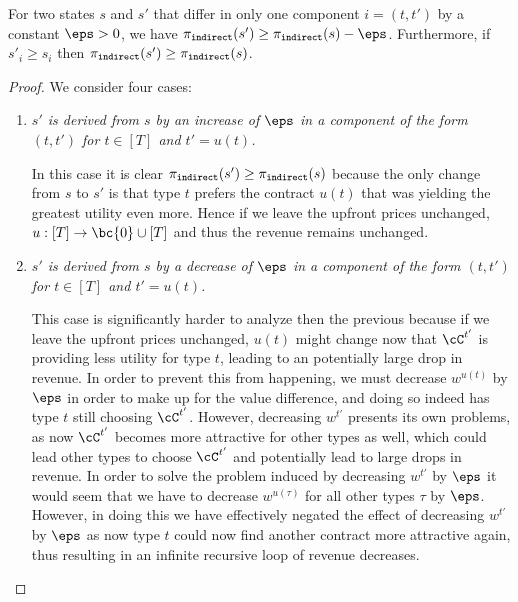 
    \begin{claim*} \label{differ}
         For two states $s$ and $s'$ that differ in only one component $i = (t, t')$ by a constant $\eps>0$, we have $\pi_{\tt{indirect}}(s') \ge \pi_{\tt{indirect}}(s) - \eps$. Furthermore, if $s'_i \ge s_i$ then $\pi_{\tt{indirect}}(s') \ge \pi_{\tt{indirect}}(s)$.
    \end{claim*}
    \begin{proof}
        We consider four cases:

    \begin{enumerate}
        
        \item[\tbf{Case 1:}] \emph{$s'$ is derived from $s$ by an increase of $\eps$ in a component of the form $(t,t')$ for $t\in [T]$ and $t' = u(t)$.}

        In this case it is clear $\pi_{\tt{indirect}}(s') \ge \pi_{\tt{indirect}}(s)$ because the only change from $s$ to $s'$ is that type $t$ prefers the contract $u(t)$ that was yielding the greatest utility even more. Hence if we leave the upfront prices unchanged, $u:[T]\to  \bc{0} \cup [T]$ and thus the revenue remains unchanged.

        \item[\tbf{Case 2:}] \emph{$s'$ is derived from $s$ by a decrease of $\eps$ in a component of the form $(t,t')$ for $t\in [T]$ and $t' = u(t)$.}

        This case is significantly harder to analyze then the previous because if we leave the upfront prices unchanged, $u(t)$ might change now that $\cC^{t'}$ is providing less utility for type $t$, leading to an potentially large drop in revenue. In order to prevent this from happening, we must decrease $w^{u(t)}$ by $\eps$ in order to make up for the value difference, and doing so indeed has type $t$ still choosing $\cC^{t'}$. However, decreasing $w^{t'}$ presents its own problems, as now $\cC^{t'}$ becomes more attractive for other types as well, which could lead other types to choose $\cC^{t'}$ and potentially lead to large drops in revenue. In order to solve the problem induced by decreasing $w^{t'}$ by $\eps$ it would seem that we have to decrease $w^{u(\tau)}$ for all other types $\tau$ by $\eps$. However, in doing this we have effectively negated the effect of decreasing $w^{t'}$ by $\eps$ as now type $t$ could now find another contract more attractive again, thus resulting in an infinite recursive loop of revenue decreases.


\end{enumerate}
\end{proof}
